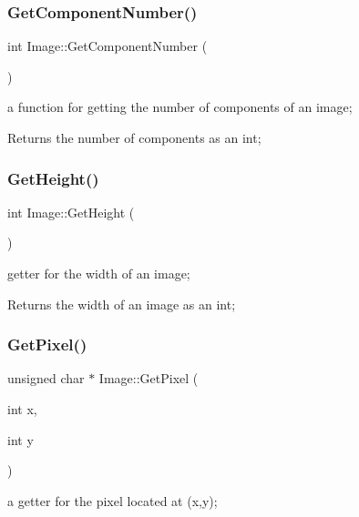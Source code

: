 \subsubsection{\texorpdfstring{Get\+Component\+Number()}{GetComponentNumber()}}
{\footnotesize\ttfamily int Image\+::\+Get\+Component\+Number (\begin{DoxyParamCaption}{ }\end{DoxyParamCaption})}



a function for getting the number of components of an image; 

\begin{DoxyReturn}{Returns}
the number of components as an int; 
\end{DoxyReturn}
\mbox{\label{classImage_a4d6de643ee334ff52c85da9a62d9297d}} 
\subsubsection{\texorpdfstring{Get\+Height()}{GetHeight()}}
{\footnotesize\ttfamily int Image\+::\+Get\+Height (\begin{DoxyParamCaption}{ }\end{DoxyParamCaption})}



getter for the width of an image; 

\begin{DoxyReturn}{Returns}
the width of an image as an int; 
\end{DoxyReturn}
\mbox{\label{classImage_aa0b312879805efe9b0bf50929383026d}} 
\subsubsection{\texorpdfstring{Get\+Pixel()}{GetPixel()}}
{\footnotesize\ttfamily unsigned char $\ast$ Image\+::\+Get\+Pixel (\begin{DoxyParamCaption}\item[{int}]{x,  }\item[{int}]{y }\end{DoxyParamCaption})}



a getter for the pixel located at (x,y); 

